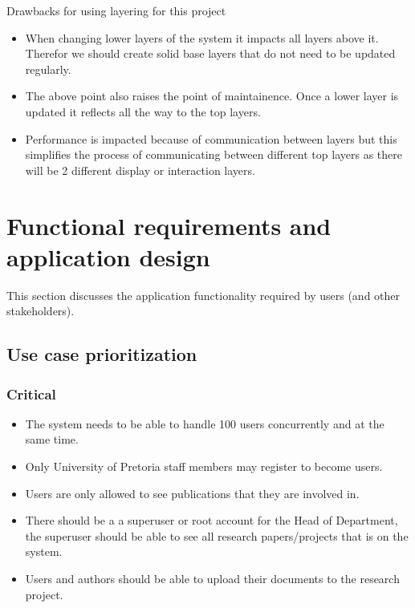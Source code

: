 \documentclass[a4paper,12pt]{report}
\begin{document}
Drawbacks for using layering for this project
\begin{itemize}
	\item When changing lower layers of the system it impacts all layers above it. Therefor we should create solid base layers that do not need to be updated regularly.
	\item The above point also raises the point of maintainence. Once a lower layer is updated it reflects all the way to the top layers.
	\item Performance is impacted because of communication between layers but this simplifies the process of communicating between different top layers as there will be 2 different display or interaction layers.
\end{itemize}

\newpage
\section{Functional requirements and application design}
This section discusses the application functionality required by users (and other stakeholders).
\subsection{Use case prioritization}
\subsubsection{Critical}
	\begin{itemize}
		\item The system needs to be able to handle 100 users concurrently and at the same time.
		\item Only University of Pretoria staff members may register to become users.
		\item Users are only allowed to see publications that they are involved in.
		\item There should be a a superuser or root account for the Head of Department, the superuser should be able to see all research papers/projects that is on the system.
		\item Users and authors should be able to upload their documents to the research project.
	\end{itemize}
\end{document}
